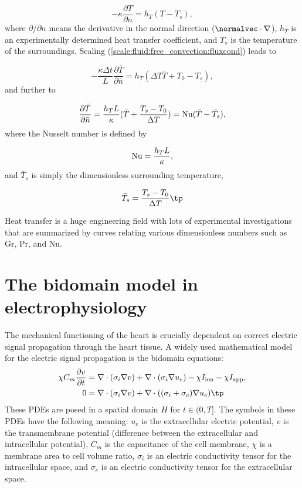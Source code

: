 \documentclass[graybox,envcountchap,sectrefs,final]{svmonodo}
\begin{document}
\begin{equation}
-\kappa\frac{\partial T}{\partial n} = h_T(T - T_s),
\label{scale:fluid:free_convection:fluxcond}
\end{equation}
where $\partial/\partial n$ means the derivative in the normal direction
($\normalvec\cdot\nabla$), $h_T$ is an experimentally determined
heat transfer coefficient, and $T_s$ is the temperature of
the surroundings. Scaling (\ref{scale:fluid:free_convection:fluxcond})
leads to

\[ -\frac{\kappa\Delta t}{L}\frac{\partial \bar T}{\partial \bar n} = h_T(\Delta T \bar T + T_0 - T_s),\]
and further to

\[ \frac{\partial \bar T}{\partial \bar n} =
\frac{h_TL}{\kappa}(\bar T + \frac{T_s - T_0}{\Delta T})
= \hbox{Nu}(\bar T - \bar T_s),
\]
where the Nusselt number is defined by

\[ \hbox{Nu} = \frac{h_TL}{\kappa},\]
and $\bar T_s$ is simply the dimensionless surrounding temperature,

\[ \bar T_s = \frac{T_s - T_0}{\Delta T}\tp\]

Heat transfer is a huge engineering
field with lots of experimental investigations
that are summarized by curves relating various dimensionless numbers
such as Gr, Pr, and Nu.

\section{The bidomain model in electrophysiology}
\label{scale:bidomain}

The mechanical functioning of the heart is crucially dependent on
correct electric signal propagation through the heart tissue.
A widely used mathematical
model for the electric signal propagation is the bidomain equations:
\begin{align}
\chi C_m\frac{\partial v}{\partial t} &=
\nabla\cdot( \sigma_i\nabla v) + \nabla\cdot (\sigma_i\nabla u_e) - \chi I_{\rm{ion}}
- \chi I_{\rm{app}},
\label{scale:bidomain:eqv}\\ 
0 &= \nabla\cdot( \sigma_i\nabla v) + \nabla\cdot ((\sigma_i + \sigma_e)\nabla u_e)\tp
\label{scale:bidomain:equ_e}
\end{align}
These PDEs are posed in a spatial domain $H$ for $t\in (0, T]$. The symbols in these PDEs have the following meaning:
$u_e$ is the extracellular electric potential,
$v$ is the transmembrane potential (difference between the extracellular
and intracellular potential),
$C_m$ is the capacitance of the cell membrane,
$\chi$ is a membrane area to cell volume ratio,
$\sigma_i$ is an electric conductivity tensor for the intracellular space, and
$\sigma_e$ is an electric conductivity tensor for the extracellular space.
\end{document}
